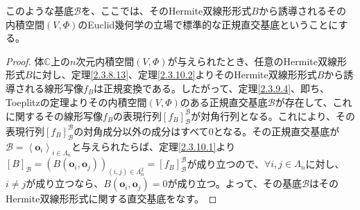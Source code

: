 \documentclass[dvipdfmx]{jsarticle}
\begin{document}
\begin{dfn}
このような基底$\mathcal{B}$を、ここでは、そのHermite双線形形式$B$から誘導されるその内積空間$(V,\varPhi)$のEuclid幾何学の立場で標準的な正規直交基底ということにする。
\end{dfn}
\begin{proof}
体$\mathbb{C}$上の$n$次元内積空間$(V,\varPhi)$が与えられたとき、任意のHermite双線形形式$B$に対し、定理\ref{2.3.8.13}、定理\ref{2.3.10.2}よりそのHermite双線形形式$B$から誘導される線形写像$f_{B}$は正規変換である。したがって、定理\ref{2.3.9.4}、即ち、Toeplitzの定理よりその内積空間$(V,\varPhi)$のある正規直交基底$\mathcal{B}$が存在して、これに関するその線形写像$f_{B}$の表現行列$\left[ f_{B} \right]_{\mathcal{B}}^{\mathcal{B}}$が対角行列となる。これにより、その表現行列$\left[ f_{B} \right]_{\mathcal{B}}^{\mathcal{B}}$の対角成分以外の成分はすべて$0$となる。その正規直交基底が$\mathcal{B} =\left\langle \mathbf{o}_{i} \right\rangle_{i \in \varLambda_{n}}$と与えられたらば、定理\ref{2.3.10.1}より$[ B]_{\mathcal{B}} = \left( B\left( \mathbf{o}_{i},\mathbf{o}_{j} \right) \right)_{(i,j) \in \varLambda_{n}^{2}} = \left[ f_{B} \right]_{\mathcal{B}}^{\mathcal{B}}$が成り立つので、$\forall i,j \in \varLambda_{n}$に対し、$i \neq j$が成り立つなら、$B\left( \mathbf{o}_{i},\mathbf{o}_{j} \right) = 0$が成り立つ。よって、その基底$\mathcal{B}$はそのHermite双線形形式に関する直交基底をなす。
\end{proof}
\end{document}
